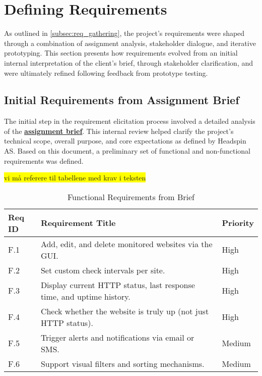 \section{Defining Requirements}
\label{sec:def_req}

As outlined in \autoref{subsec:req_gathering}, the project’s requirements were shaped through a combination of assignment analysis, stakeholder dialogue, and iterative prototyping. This section presents how requirements evolved from an initial internal interpretation of the client’s brief, through stakeholder clarification, and were ultimately refined following feedback from prototype testing.

\subsection{Initial Requirements from Assignment Brief}
\label{subsec:req_from_brief}
The initial step in the requirement elicitation process involved a detailed analysis of the \textbf{\hyperref[app:headspin-brief]{assignment brief}}. This internal review helped clarify the project’s technical scope, overall purpose, and core expectations as defined by Headspin AS. Based on this document, a preliminary set of functional and non-functional requirements was defined.



\colorbox{yellow}{vi må referere til tabellene med krav i teksten}

\begin{table}[H]
\centering
\caption{Functional Requirements from Brief}
\label{tab:functional_reqs_brief}
\begin{tabular}{| l  |p{}  |l |} 
\hline
\textbf{Req ID} & \textbf{Requirement Title} & \textbf{Priority} \\
\hline
F.1 & Add, edit, and delete monitored websites via the GUI. & High \\ \hline 
F.2 & Set custom check intervals per site. & High \\ \hline 
F.3 & Display current HTTP status, last response time, and uptime history. & High \\ \hline 
F.4 & Check whether the website is truly up (not just HTTP status). & High \\ \hline 
F.5 & Trigger alerts and notifications via email or SMS. & Medium \\ \hline
F.6 & Support visual filters and sorting mechanisms. & Medium \\
\hline
\end{tabular}
\end{table}

